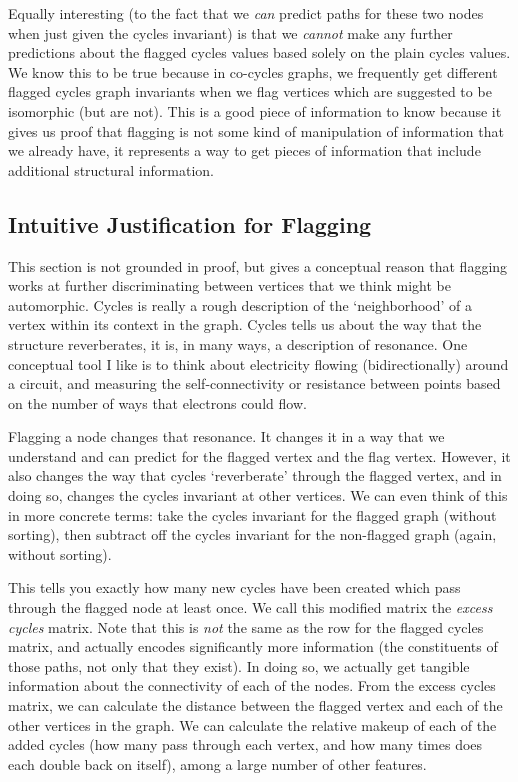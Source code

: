 Equally interesting (to the fact that we \emph{can} predict paths for these two nodes when just given the cycles invariant) is that we \emph{cannot} make any further predictions about the flagged cycles values based solely on the plain cycles values.
We know this to be true because in co-cycles graphs, we frequently get different flagged cycles graph invariants when we flag vertices which are suggested to be isomorphic (but are not).
This is a good piece of information to know because it gives us proof that flagging is not some kind of manipulation of information that we already have, it represents a way to get pieces of information that include additional structural information.

\subsection{Intuitive Justification for Flagging}

This section is not grounded in proof, but gives a conceptual reason that flagging works at further discriminating between vertices that we think might be automorphic.
Cycles is really a rough description of the `neighborhood' of a vertex within its context in the graph.
Cycles tells us about the way that the structure reverberates, it is, in many ways, a description of resonance.
One conceptual tool I like is to think about electricity flowing (bidirectionally) around a circuit, and measuring the self-connectivity or resistance between points based on the number of ways that electrons could flow.

Flagging a node changes that resonance.
It changes it in a way that we understand and can predict for the flagged vertex and the flag vertex.
However, it also changes the way that cycles `reverberate' through the flagged vertex, and in doing so, changes the cycles invariant at other vertices.
We can even think of this in more concrete terms: take the cycles invariant for the flagged graph (without sorting), then subtract off the cycles invariant for the non-flagged graph (again, without sorting).

This tells you exactly how many new cycles have been created which pass through the flagged node at least once.
We call this modified matrix the \emph{excess cycles} matrix.
Note that this is \emph{not} the same as the row for the flagged cycles matrix, and actually encodes significantly more information (the constituents of those paths, not only that they exist).
In doing so, we actually get tangible information about the connectivity of each of the nodes.
From the excess cycles matrix, we can calculate the distance between the flagged vertex and each of the other vertices in the graph.
We can calculate the relative makeup of each of the added cycles (how many pass through each vertex, and how many times does each double back on itself), among a large number of other features.

